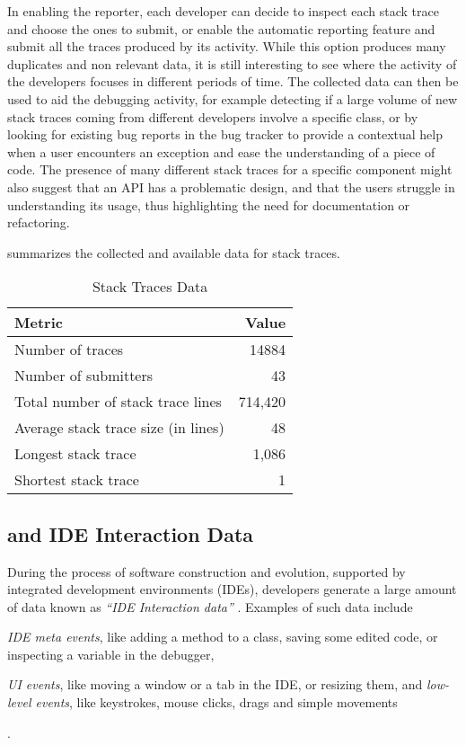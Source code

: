 In enabling the reporter, each developer can decide to inspect each stack trace and choose the ones to submit, or enable the automatic reporting feature and submit all the traces produced by its activity.
While this option produces many duplicates and non relevant data, it is still interesting to see where the activity of the developers focuses in different periods of time.
The collected data can then be used to aid the debugging activity, for example detecting if a large volume of new stack traces coming from different developers involve a specific class, or by looking for existing bug reports in the bug tracker to provide a contextual help when a user encounters an exception and ease the understanding of a piece of code.
The presence of many different stack traces for a specific component might also suggest that an API has a problematic design, and that the users struggle in understanding its usage, thus highlighting the need for documentation or refactoring.

 summarizes the collected and available data for stack traces.

\begin{table}[ht]
\caption{Stack Traces Data}
\label{tab:stacktraces}
\begin{tabularx}{\linewidth}{X|r}

\rowcolor{gray!30} \textbf{Metric} & \textbf{Value} \\ \hline Number of traces & 14884 \\
 Number of submitters & 43 \\
 Total number of stack trace lines & 714,420 \\
 Average stack trace size (in lines) & 48 \\
 Longest stack trace & 1,086 \\
 Shortest stack trace & 1 \\
\end{tabularx}
\end{table}




\subsection{\dfl and IDE Interaction Data}\label{sub:interaction}

During the process of software construction and evolution, supported by integrated development environments (IDEs), developers generate a large amount of data known as \emph{``IDE Interaction data''} \cite{Kers2005, Murp2006}.
Examples of such data include \begin{inparaenum}[i)] \item \emph{IDE meta events}, like adding a method to a class, saving some edited code, or inspecting a variable in the debugger, \item \emph{UI events}, like moving a window or a tab in the IDE, or resizing them, and \emph{low-level events}, like keystrokes, mouse clicks, drags and simple movements\end{inparaenum}.

